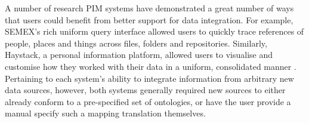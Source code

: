 \documentclass{sigchi}
\begin{document}
A number of research PIM systems have demonstrated a great number of ways that users could benefit from better support for data integration.  For example, SEMEX's \cite{semex} rich uniform query interface allowed users to quickly trace references of people, places and things across files, folders and repositories.  Similarly, Haystack, a personal information platform, allowed users to visualise and customise how they worked with their data in a uniform, consolidated manner \cite{haystack}. Pertaining to each system's ability to integrate information from arbitrary new data sources, however, both systems generally required new sources to either already conform to a pre-specified set of ontologies, or have the user provide a manual specify such a mapping translation themselves.


\end{document}
